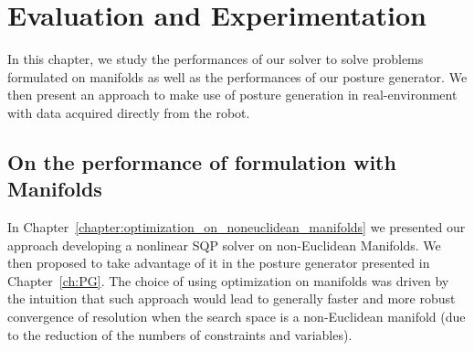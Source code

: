 

\chapter{Evaluation and Experimentation}
\label{cha:evaluation_and_experimentation}

\graphicspath{{Chapter6-Evaluation/Figs/}}

In this chapter, we study the performances of our solver to solve problems formulated on manifolds as well as the performances of our posture generator.
We then present an approach to make use of posture generation in real-environment with data acquired directly from the robot.

\section{On the performance of formulation with Manifolds}
\label{sec:On_the_performance_of_formulation_with_manifolds}

In Chapter~\ref{chapter:optimization_on_noneuclidean_manifolds} we presented our approach developing a nonlinear SQP solver on non-Euclidean Manifolds.
We then proposed to take advantage of it in the posture generator presented in Chapter~\ref{ch:PG}.
The choice of using optimization on manifolds was driven by the intuition that such approach would lead to generally faster and more robust convergence of resolution when the search space is a non-Euclidean manifold (due to the reduction of the numbers of constraints and variables).

